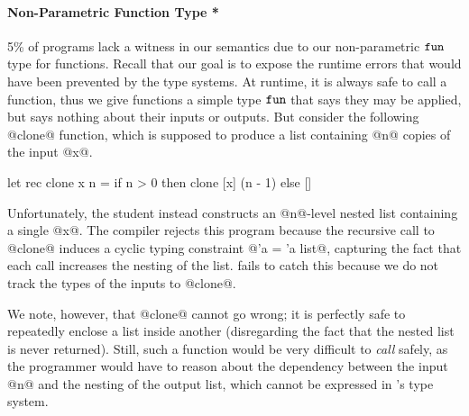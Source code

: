 

\paragraph{Non-Parametric Function Type *}
%
5\% of programs lack a witness in our semantics due to our
non-parametric $\mathtt{fun}$ type for functions.
%
Recall that our goal is to expose the runtime errors that would have
been prevented by the type systems.
%
At runtime, it is always safe to call a function, thus we give functions
a simple type $\mathtt{fun}$ that says they may be applied, but says nothing
about their inputs or outputs.
%
But consider the following @clone@ function, which is supposed to
produce a list containing @n@ copies of the input @x@.
%
%
\begin{code}
  let rec clone x n =
    if n > 0 then
      clone [x] (n - 1)
    else
      []
\end{code}
%
Unfortunately, the student instead constructs an @n@-level nested list
containing a single @x@.
%
The \ocaml compiler rejects this program because the recursive call to
@clone@ induces a cyclic typing constraint @'a = 'a list@, capturing the
fact that each call increases the nesting of the list.
%
\toolname fails to catch this because we do not track the types of the
inputs to @clone@.

We note, however, that @clone@ cannot go wrong; it is perfectly safe to
repeatedly enclose a list inside another (disregarding the fact that the
nested list is never returned).
%
Still, such a function would be very difficult to \emph{call} safely, as
the programmer would have to reason about the dependency between the
input @n@ and the nesting of the output list, which cannot be expressed
in \ocaml's type system.

